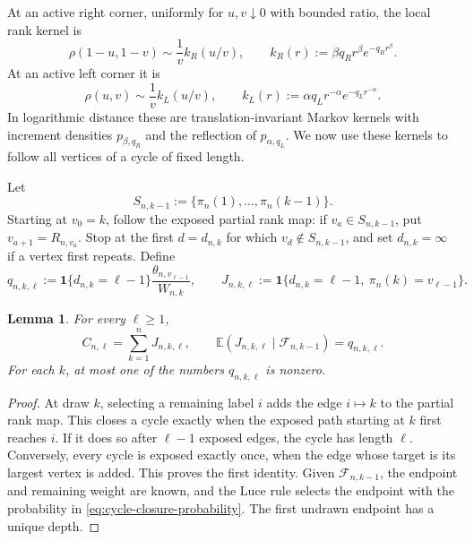 \documentclass[11pt]{article}
\newtheorem{lemma}[theorem]{Lemma}
\theoremstyle{remark}
\theoremstyle{plain}
\newcommand{\E}{\mathbb E}
\newcommand{\one}{\mathbf 1}
\newcommand{\cF}{\mathcal F}
\begin{document}
At an active right corner, uniformly for $u,v\downarrow0$ with bounded
ratio, the local rank kernel is
\begin{equation}\label{eq:corner-kernel}
 \rho(1-u,1-v)\sim\frac1v k_R(u/v),
 \qquad
 k_R(r):=\beta q_Rr^\beta e^{-q_Rr^\beta}.
\end{equation}
At an active left corner it is
\begin{equation}\label{eq:left-corner-kernel}
 \rho(u,v)\sim\frac1v k_L(u/v),
 \qquad
 k_L(r):=\alpha q_Lr^{-\alpha}e^{-q_Lr^{-\alpha}}.
\end{equation}
In logarithmic distance these are translation-invariant Markov kernels with
increment densities $p_{\beta,q_R}$ and the reflection of
$p_{\alpha,q_L}$.  We now use these kernels to follow all vertices of a cycle
of fixed length.

Let
\[
 S_{n,k-1}:=\{\pi_n(1),\ldots,\pi_n(k-1)\}.
\]
Starting at $v_0=k$, follow the exposed partial rank map: if
$v_a\in S_{n,k-1}$, put $v_{a+1}=R_{n,v_a}$.  Stop at the first
$d=d_{n,k}$ for which $v_d\notin S_{n,k-1}$, and set $d_{n,k}=\infty$ if a
vertex first repeats.  Define
\begin{equation}\label{eq:cycle-closure-probability}
 q_{n,k,\ell}:=
 \one\{d_{n,k}=\ell-1\}\frac{\theta_{n,v_{\ell-1}}}{W_{n,k}},
 \qquad
 J_{n,k,\ell}:=
 \one\{d_{n,k}=\ell-1,\ \pi_n(k)=v_{\ell-1}\}.
\end{equation}

\begin{lemma}\label{lem:cycle-closure}
For every $\ell\ge1$,
\begin{equation}\label{eq:cycle-closure-sum}
 C_{n,\ell}=\sum_{k=1}^nJ_{n,k,\ell},
 \qquad
 \E(J_{n,k,\ell}\mid\cF_{n,k-1})=q_{n,k,\ell}.
\end{equation}
For each $k$, at most one of the numbers $q_{n,k,\ell}$ is nonzero.
\end{lemma}

\begin{proof}
At draw $k$, selecting a remaining label $i$ adds the edge $i\mapsto k$ to
the partial rank map.  This closes a cycle exactly when the exposed path
starting at $k$ first reaches $i$.  If it does so after $\ell-1$ exposed
edges, the cycle has length $\ell$.  Conversely, every cycle is exposed
exactly once, when the edge whose target is its largest vertex is added.
This proves the first identity.  Given $\cF_{n,k-1}$, the endpoint and
remaining weight are known, and the Luce rule selects the endpoint with the
probability in \eqref{eq:cycle-closure-probability}.  The first undrawn
endpoint has a unique depth.
\end{proof}
\end{document}
